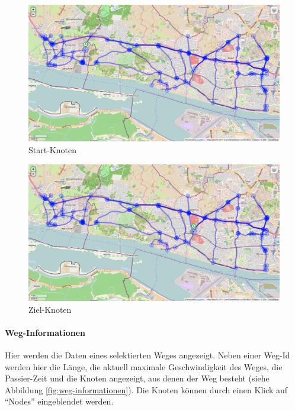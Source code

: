 \begin{figure}[htbp]
  \centering
  \includegraphics[width=\textwidth]{Bilder/Start-Knoten.png}
  \caption{Start-Knoten}
  \label{fig:start-knoten}
\end{figure}

\begin{figure}[htbp]
  \centering
  \includegraphics[width=\textwidth]{Bilder/Ziel-Knoten.png}
  \caption{Ziel-Knoten}
  \label{fig:ziel-knoten}
\end{figure}

\paragraph{Weg-Informationen}
\label{sec:weg-informationen}

Hier werden die Daten eines selektierten Weges angezeigt.
Neben einer Weg-Id werden hier die Länge, die aktuell maximale Geschwindigkeit des Weges, die Passier-Zeit und die Knoten angezeigt, aus denen der Weg besteht (siehe Abbildung \ref{fig:weg-informationen}).
Die Knoten können durch einen Klick auf ``Nodes'' eingeblendet werden.

